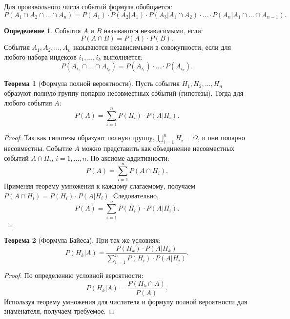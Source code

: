 \documentclass[a4paper]{article}
\theoremstyle{definition}
\newtheorem{definition}{Определение}[subsection]
\newtheorem{theorem}{Теорема}[subsection]
\begin{document}
Для произвольного числа событий формула обобщается:
\begin{equation}
    P(A_1 \cap A_2 \cap \dots \cap A_n) = P(A_1) \cdot P(A_2|A_1) \cdot P(A_3|A_1 \cap A_2) \cdot \dots \cdot P(A_n|A_1 \cap \dots \cap A_{n-1}). \tag{8}
\end{equation}

\begin{definition}
События $A$ и $B$ называются независимыми, если:
\begin{equation}
    P(A \cap B) = P(A) \cdot P(B). \tag{9}
\end{equation}
События $A_1, A_2, \dots, A_n$ называются независимыми в совокупности, если для любого набора индексов $i_1, \dots, i_k$ выполняется:
\begin{equation}
    P(A_{i_1} \cap \dots \cap A_{i_k}) = P(A_{i_1}) \cdot \dots \cdot P(A_{i_k}). \tag{10}
\end{equation}
\end{definition}

\begin{theorem}[Формула полной вероятности]
Пусть события $H_1, H_2, \dots, H_n$ образуют полную группу попарно несовместных событий (гипотезы). Тогда для любого события $A$:
\begin{equation}
    P(A) = \sum_{i=1}^{n} P(H_i) \cdot P(A|H_i). \tag{11}
\end{equation}
\end{theorem}

\begin{proof}
Так как гипотезы образуют полную группу, $\bigcup_{i=1}^n H_i = \Omega$, и они попарно несовместны. Событие $A$ можно представить как объединение несовместных событий $A \cap H_i$, $i=1,\dots,n$. По аксиоме аддитивности:
\[
P(A) = \sum_{i=1}^n P(A \cap H_i).
\]
Применяя теорему умножения к каждому слагаемому, получаем $P(A \cap H_i) = P(H_i) \cdot P(A|H_i)$. Следовательно,
\[
P(A) = \sum_{i=1}^n P(H_i) \cdot P(A|H_i).
\]
\end{proof}

\begin{theorem}[Формула Байеса]
При тех же условиях:
\begin{equation}
    P(H_k|A) = \frac{P(H_k) \cdot P(A|H_k)}{\sum_{i=1}^{n} P(H_i) \cdot P(A|H_i)}. \tag{12}
\end{equation}
\end{theorem}

\begin{proof}
По определению условной вероятности:
\[
P(H_k|A) = \frac{P(H_k \cap A)}{P(A)}.
\]
Используя теорему умножения для числителя и формулу полной вероятности для знаменателя, получаем требуемое.
\end{proof}
\end{document}
